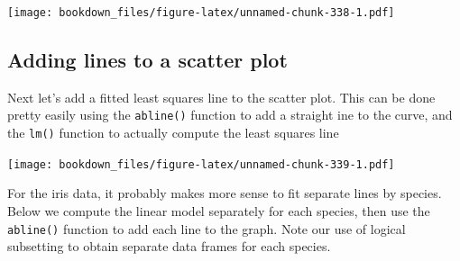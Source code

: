 \documentclass[
]{krantz}
\makeatletter
\newenvironment{Shaded}{\begin{snugshade}}{\end{snugshade}}
\newcommand{\DataTypeTok}[1]{\textcolor[rgb]{0.27,0.27,0.27}{#1}}
\newcommand{\DecValTok}[1]{\textcolor[rgb]{0.06,0.06,0.06}{#1}}
\newcommand{\FloatTok}[1]{\textcolor[rgb]{0.06,0.06,0.06}{#1}}
\newcommand{\KeywordTok}[1]{\textcolor[rgb]{0.27,0.27,0.27}{\textbf{#1}}}
\newcommand{\NormalTok}[1]{#1}
\newcommand{\OperatorTok}[1]{\textcolor[rgb]{0.43,0.43,0.43}{\textbf{#1}}}
\newcommand{\StringTok}[1]{\textcolor[rgb]{0.5,0.5,0.5}{#1}}
\newenvironment{kframe}{%
\medskip{}
\setlength{\fboxsep}{.8em}
 \def\at@end@of@kframe{}%
 \ifinner\ifhmode%
  \def\at@end@of@kframe{\end{minipage}}%
  \begin{minipage}{\columnwidth}%
 \fi\fi%
 \def\FrameCommand##1{\hskip\@totalleftmargin \hskip-\fboxsep
 \colorbox{shadecolor}{##1}\hskip-\fboxsep
     \hskip-\linewidth \hskip-\@totalleftmargin \hskip\columnwidth}%
 \MakeFramed {\advance\hsize-\width
   \@totalleftmargin\z@ \linewidth\hsize
   \@setminipage}}%
 {\par\unskip\endMakeFramed%
 \at@end@of@kframe}
\renewenvironment{Shaded}{\begin{kframe}}{\end{kframe}}
\makeatother
\begin{document}
\texttt{[image: bookdown\_files/figure-latex/unnamed-chunk-338-1.pdf]}

\hypertarget{adding-lines-to-a-scatter-plot-1}{%
\subsection{Adding lines to a scatter plot}\label{adding-lines-to-a-scatter-plot-1}}

Next let's add a fitted least squares line to the scatter plot. This can be done pretty easily using the \texttt{abline()} function to add a straight ine to the curve, and the \texttt{lm()} function to actually compute the least squares line

\begin{Shaded}
\end{Shaded}

\texttt{[image: bookdown\_files/figure-latex/unnamed-chunk-339-1.pdf]}

For the iris data, it probably makes more sense to fit separate lines by species. Below we compute the linear model separately for each species, then use the \texttt{abline()} function to add each line to the graph. Note our use of logical subsetting to obtain separate data frames for each species.
\end{document}
